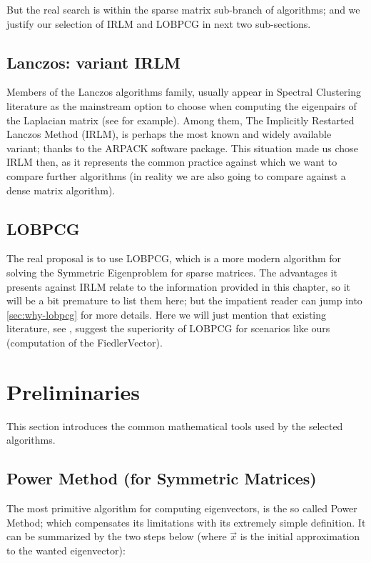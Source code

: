 But the real search is within the sparse matrix sub-branch of
algorithms; and we justify our selection of \gls{IRLM} and
\gls{LOBPCG} in next two sub-sections.

\subsection{Lanczos: variant \gls{IRLM}}

Members of the Lanczos algorithms family, 
usually appear in Spectral Clustering literature as the mainstream
option to choose when computing the eigenpairs of the
\gls{Laplacian} matrix (see \cite{luxburg07} for example). Among them,
The Implicitly Restarted Lanczos Method (\gls{IRLM}), is perhaps
the most known and widely available variant; thanks to the
ARPACK \cite{arpack} software package. This situation made us chose
\gls{IRLM} then, as it represents the common practice
against which we want to compare further algorithms (in reality we are
also going to compare against a dense matrix algorithm).

\subsection{\gls{LOBPCG}}

The real proposal is to use \gls{LOBPCG}, which is a more modern
algorithm for solving the Symmetric Eigenproblem for sparse
matrices. The advantages it presents against \gls{IRLM} relate to the
information provided in this chapter, so it will be a bit premature to
list them here; but the impatient reader can jump into
\cref{sec:why-lobpcg} for more details. Here we will just mention that
existing literature, see \cite{knyazev03}, suggest the superiority of LOBPCG
for scenarios like ours (computation of the \gls{FiedlerVector}).

\section{Preliminaries}

This section introduces the common mathematical tools used by the
selected algorithms.

\subsection{Power Method (for Symmetric Matrices)}

The most primitive algorithm for computing eigenvectors, is the so
called Power Method; which compensates its limitations with its
extremely simple definition. It can be summarized by the
two steps below (where $\vec{x}$ is the initial approximation to the
wanted eigenvector):

